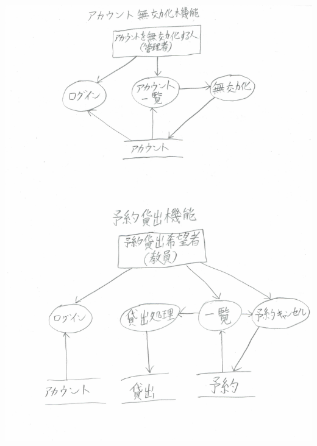 \documentclass[a4paper]{jarticle}
\begin{document}
\begin{enumerate}
\begin{center}
 \includegraphics[width=15cm]{DFD2.JPG}
 \end{center}
\end{enumerate}
\end{document}
